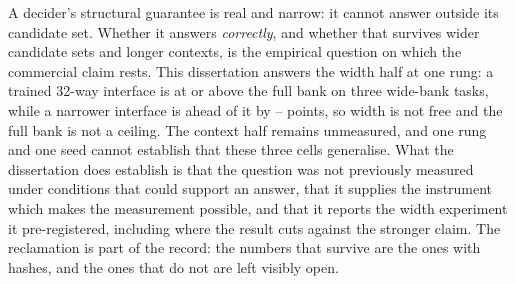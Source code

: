 A decider's structural guarantee is real and narrow: it cannot answer outside its
candidate set. Whether it answers \emph{correctly}, and whether that survives wider
candidate sets and longer contexts, is the empirical question on which the
commercial claim rests. This dissertation answers the width half at one rung: a
trained 32-way interface is at or above the full bank on three wide-bank tasks,
while a narrower interface is ahead of it by \ECostTwoToThirtyTwoMin--\ECostTwoToThirtyTwoMax{} points, so width is not
free and the full bank is not a ceiling. The context half remains unmeasured, and
one rung and one seed cannot establish that these three cells generalise. What the
dissertation does establish is that the question was not previously measured under
conditions that could support an answer, that it supplies the instrument which
makes the measurement possible, and that it reports the width experiment it
pre-registered, including where the result cuts against the stronger claim. The
reclamation is part of the record: the numbers that survive are the ones with
hashes, and the ones that do not are left visibly open.
